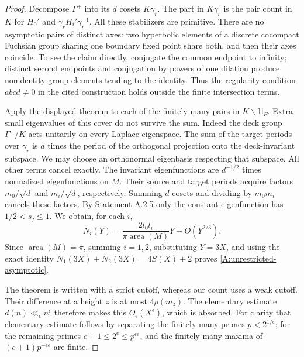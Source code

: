 \begin{proof}
Decompose $\Gamma^+$ into its $d$ cosets $K\gamma_r$.
The part in $K\gamma_r$ is the pair count in $K$ for $H_0'$ and
$\gamma_rH_i'\gamma_r^{-1}$. All these stabilizers are primitive.
There are no asymptotic pairs of distinct axes: two hyperbolic
elements of a discrete cocompact Fuchsian group sharing one boundary
fixed point share both, and then their axes coincide. To see the
claim directly, conjugate the common endpoint to infinity; distinct
second endpoints and conjugation by powers of one dilation produce
nonidentity group elements tending to the identity. Thus the
regularity condition $abcd\ne0$ in the cited construction holds
outside the finite intersection terms.

Apply the displayed theorem to each of the finitely many pairs in
$K\backslash\mathbb H_F$. Extra small eigenvalues of this cover do
not survive the sum. Indeed the deck group $\Gamma^+/K$ acts
unitarily on every Laplace eigenspace. The sum of the target periods
over $\gamma_r$ is $d$ times the period of the orthogonal projection
onto the deck-invariant subspace. We may choose an orthonormal
eigenbasis respecting that subspace. All other terms cancel exactly.
The invariant eigenfunctions are $d^{-1/2}$ times normalized
eigenfunctions on $M$. Their source and target periods acquire
factors $m_0/\sqrt d$ and $m_i/\sqrt d$, respectively. Summing $d$
cosets and dividing by $m_0m_i$ cancels these factors. By Statement
A.2.5 only the constant eigenfunction has $1/2<s_j\leq1$.
We obtain, for each $i$,
\[
 N_i(Y)=\frac{2l_0l_i}{\pi\operatorname{area}(M)}Y
       +O(Y^{2/3}).
\]
Since $\operatorname{area}(M)=\pi$, summing $i=1,2$, substituting
$Y=3X$, and using the exact identity
$N_1(3X)+N_2(3X)=4S(X)+2$ proves
\eqref{A:unrestricted-asymptotic}.

The theorem is written with a strict cutoff, whereas our count uses
a weak cutoff. Their difference at a height $z$ is at most
$4\rho(m_z)$. The elementary estimate $d(n)\ll_\epsilon n^\epsilon$
therefore makes this $O_\epsilon(X^\epsilon)$, which is absorbed.
For clarity that elementary estimate follows by separating the
finitely many primes $p<2^{1/\epsilon}$; for the remaining primes
$e+1\leq2^e\leq p^{\epsilon e}$, and the finitely many maxima of
$(e+1)p^{-\epsilon e}$ are finite.
\end{proof}

